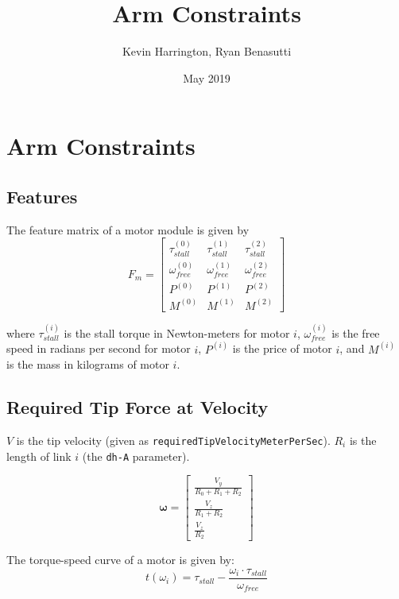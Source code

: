\documentclass{article}
\title{Arm Constraints}
\author{Kevin Harrington, Ryan Benasutti}
\date{May 2019}
\begin{document}
\maketitle

\FloatBarrier
\section{Arm Constraints}

\FloatBarrier
\subsection{Features}

The feature matrix of a motor module is given by
\begin{equation}
    F_m =
    \begin{bmatrix}
        \tau_{stall}^{(0)} & \tau_{stall}^{(1)} & \tau_{stall}^{(2)} \\[6pt]
        \omega_{free}^{(0)} & \omega_{free}^{(1)} & \omega_{free}^{(2)} \\[6pt]
        P^{(0)} & P^{(1)} & P^{(2)} \\[6pt]
        M^{(0)} & M^{(1)} & M^{(2)}
    \end{bmatrix}
\end{equation}

where $\tau_{stall}^{(i)}$ is the stall torque in Newton-meters for motor $i$, $\omega_{free}^{(i)}$
is the free speed in radians per second for motor $i$, $P^{(i)}$ is the price of motor $i$, and
$M^{(i)}$ is the mass in kilograms of motor $i$.

\FloatBarrier
\subsection{Required Tip Force at Velocity}

$V$ is the tip velocity (given as \texttt{requiredTipVelocityMeterPerSec}). $R_i$ is the length of
link $i$ (the \texttt{dh-A} parameter).

\begin{equation}
    \boldsymbol{\omega} =
    \begin{bmatrix}
        \frac{V_y}{R_0 + R_1 + R_2} \\[6pt]
        \frac{V_z}{R_1 + R_2} \\[6pt]
        \frac{V_z}{R_2}
    \end{bmatrix}
\end{equation}

The torque-speed curve of a motor is given by:
\begin{equation}
    t(\omega_i) = \tau_{stall} - \frac{\omega_i \cdot \tau_{stall}}{\omega_{free}}
\end{equation}
\end{document}
